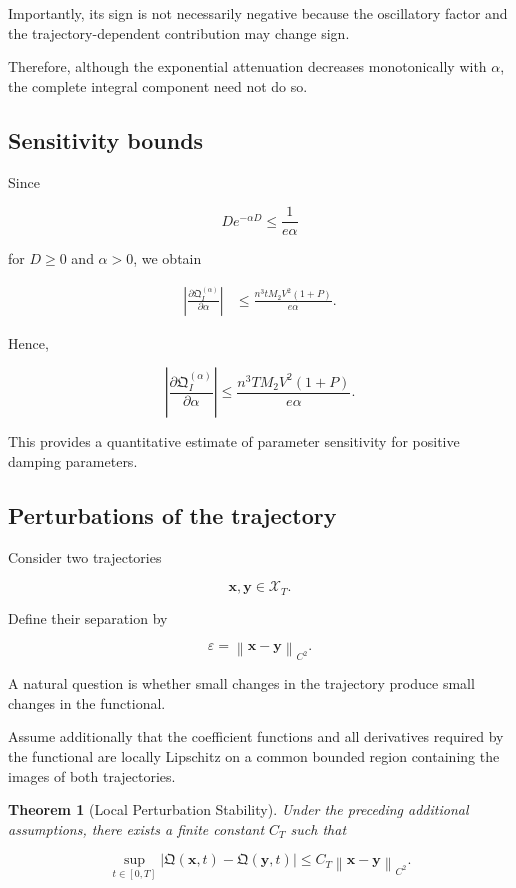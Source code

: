 \documentclass[12pt]{article}
\numberwithin{equation}{section}
\newcommand{\norm}[1]{\left\lVert #1 \right\rVert}
\newcommand{\Q}{\mathfrak{Q}}
\newcommand{\eps}{\varepsilon}
\newtheorem{theorem}{Theorem}[section]
\theoremstyle{definition}
\theoremstyle{remark}
\begin{document}
Importantly, its sign is not necessarily
negative because the oscillatory factor
and the trajectory-dependent contribution
may change sign.

Therefore, although the exponential
attenuation decreases monotonically
with \(\alpha\), the complete integral
component need not do so.

\subsection{Sensitivity bounds}

Since

\[
D e^{-\alpha D}\leq\frac{1}{e\alpha}
\]

for \(D\geq0\) and \(\alpha>0\), we obtain

\[
\begin{aligned}
\left|
\frac{\partial\Q_I^{(\alpha)}}{\partial\alpha}
\right|
&\leq
\frac{n^3tM_2V^2(1+P)}
{e\alpha}.
\end{aligned}
\]

Hence,

\[
\left|
\frac{\partial\Q_I^{(\alpha)}}{\partial\alpha}
\right|
\leq
\frac{n^3TM_2V^2(1+P)}
{e\alpha}.
\]

This provides a quantitative estimate
of parameter sensitivity for positive
damping parameters.

\subsection{Perturbations of the trajectory}

Consider two trajectories

\[
\mathbf{x},\mathbf{y}
\in\mathcal{X}_T.
\]

Define their separation by

\[
\eps
=
\norm{\mathbf{x}-\mathbf{y}}_{C^2}.
\]

A natural question is whether small
changes in the trajectory produce small
changes in the functional.

Assume additionally that the coefficient
functions and all derivatives required
by the functional are locally Lipschitz
on a common bounded region containing
the images of both trajectories.

\begin{theorem}[Local Perturbation Stability]

Under the preceding additional assumptions,
there exists a finite constant \(C_T\)
such that

\[
\sup_{t\in[0,T]}
|\Q(\mathbf{x},t)-\Q(\mathbf{y},t)|
\leq
C_T
\norm{\mathbf{x}-\mathbf{y}}_{C^2}.
\]

\end{theorem}
\end{document}
